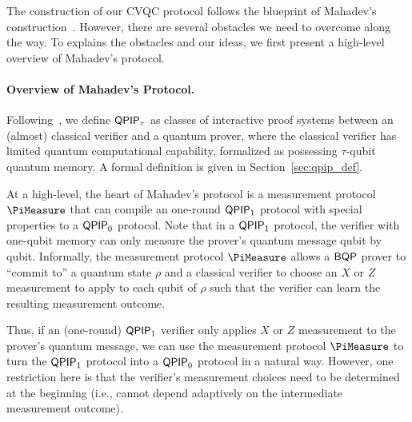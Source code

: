 % 


The construction of our CVQC protocol follows the blueprint of Mahadev's construction~\cite{FOCS:Mahadev18a}. However, there are several obstacles we need to overcome along the way. To explains the obstacles and our ideas, we first present a high-level overview of Mahadev's protocol.



\paragraph{Overview of Mahadev's Protocol.}
%
Following~\cite{FOCS:Mahadev18a}, we define $\operatorname{\mathsf{QPIP}}_{\tau}$ as classes of interactive proof systems between an (almost) classical verifier and a quantum prover, where the classical verifier has limited quantum computational capability, formalized as possessing $\tau$-qubit quantum memory. %
A formal definition is given in Section~\ref{sec:qpip_def}. 

At a high-level, the heart of Mahadev's protocol is a measurement protocol $\PiMeasure$ that can compile an one-round $\operatorname{\mathsf{QPIP}}_1$ protocol with special properties to a $\operatorname{\mathsf{QPIP}}_0$ protocol. Note that in a $\operatorname{\mathsf{QPIP}}_1$ protocol, the verifier with one-qubit memory can only measure the prover's quantum message qubit by qubit. Informally, the measurement protocol $\PiMeasure$ allows a $\operatorname{\mathsf{BQP}}$ prover to ``commit to'' a quantum state $\rho$ and a classical verifier to choose an $X$ or $Z$ measurement to apply to each qubit of $\rho$ such that the verifier can learn the resulting measurement outcome. 

Thus, if an (one-round) $\operatorname{\mathsf{QPIP}}_1$ verifier only applies $X$ or $Z$ measurement to the prover's quantum message, we can use the measurement protocol $\PiMeasure$ to turn the $\operatorname{\mathsf{QPIP}}_1$ protocol into a $\operatorname{\mathsf{QPIP}}_0$ protocol in a natural way. However, one restriction here is that the verifier's measurement choices need to be determined at the beginning (i.e., cannot depend adaptively on the intermediate measurement outcome). 

